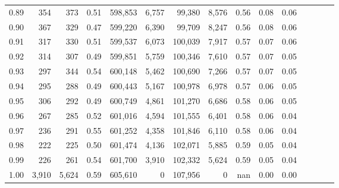 \begin{tabular}{rrrcrrrrrrrrrrr}
0.89 &     354 &    373 &                                       0.51 &  598,853 &    6,757 &   99,380 &    8,576 &  0.56 &  0.08 &                         0.06 \\
0.90 &     367 &    329 &                                       0.47 &  599,220 &    6,390 &   99,709 &    8,247 &  0.56 &  0.08 &                         0.06 \\
0.91 &     317 &    330 &                                       0.51 &  599,537 &    6,073 &  100,039 &    7,917 &  0.57 &  0.07 &                         0.06 \\
0.92 &     314 &    307 &                                       0.49 &  599,851 &    5,759 &  100,346 &    7,610 &  0.57 &  0.07 &                         0.05 \\
0.93 &     297 &    344 &                                       0.54 &  600,148 &    5,462 &  100,690 &    7,266 &  0.57 &  0.07 &                         0.05 \\
0.94 &     295 &    288 &                                       0.49 &  600,443 &    5,167 &  100,978 &    6,978 &  0.57 &  0.06 &                         0.05 \\
0.95 &     306 &    292 &                                       0.49 &  600,749 &    4,861 &  101,270 &    6,686 &  0.58 &  0.06 &                         0.05 \\
0.96 &     267 &    285 &                                       0.52 &  601,016 &    4,594 &  101,555 &    6,401 &  0.58 &  0.06 &                         0.04 \\
0.97 &     236 &    291 &                                       0.55 &  601,252 &    4,358 &  101,846 &    6,110 &  0.58 &  0.06 &                         0.04 \\
0.98 &     222 &    225 &                                       0.50 &  601,474 &    4,136 &  102,071 &    5,885 &  0.59 &  0.05 &                         0.04 \\
0.99 &     226 &    261 &                                       0.54 &  601,700 &    3,910 &  102,332 &    5,624 &  0.59 &  0.05 &                         0.04 \\
1.00 &   3,910 &  5,624 &                                       0.59 &  605,610 &        0 &  107,956 &        0 &   nan &  0.00 &                         0.00 \\
\bottomrule
\end{tabular}
